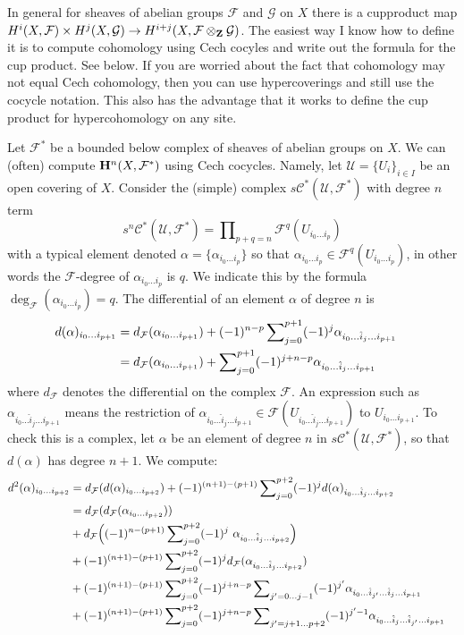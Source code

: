\noindent
In general for sheaves of abelian groups
${\mathcal F}$ and ${\mathcal G}$ on $X$ there is a cupproduct map
$H^i(X, {\mathcal F}) \times H^j(X, {\mathcal G}) \to
H^{i+j}(X, {\mathcal F}\otimes_{\bf Z} {\mathcal G})$. The easiest way
I know how to define it is to compute cohomology using Cech
cocyles and write out the formula for the cup product. See below.
If you are worried about the fact that cohomology may not
equal Cech cohomology, then you can use hypercoverings and still
use the cocycle notation. This also has the advantage that
it works to define the cup product for hypercohomology on any site.

\medskip\noindent
Let ${\mathcal F}^*$ be a bounded below complex of sheaves of abelian
groups on $X$. We can (often) compute ${\bf H}^n(X, {\mathcal F}^*)$
using Cech cocycles. Namely, let ${\mathcal U} = \{U_i\}_{i\in I}$
be an open covering of $X$. Consider the (simple) complex
$s{\mathcal C}^*({\mathcal U}, {\mathcal F}^*)$
with degree $n$ term
$$
s^n{\mathcal C}^*({\mathcal U}, {\mathcal F}^*) =
\prod\nolimits_{p+q=n} {\mathcal F}^q(U_{i_0\ldots i_p})
$$
with a typical element denoted $\alpha = \{\alpha_{i_0\ldots i_p}\}$
so that $\alpha_{i_0\ldots i_p} \in {\mathcal F}^{q}(U_{i_0\ldots i_p})$,
in other words the ${\mathcal F}$-degree of $\alpha_{i_0\ldots i_p}$ is $q$.
We indicate this by the formula $\deg_{\mathcal F}(\alpha_{i_0\ldots i_p})=q$.
The differential of an element $\alpha$ of degree $n$ is
\begin{align}
d(\alpha)_{i_0\ldots i_{p+1}}
& =
d_{{\mathcal F}}(\alpha_{i_0\ldots i_{p+1}})
+
(-1)^{n-p}
\sum\nolimits_{j=0}^{p+1}
(-1)^j
\alpha_{i_0\ldots \hat i_j \ldots i_{p+1}}\cr
& =
d_{{\mathcal F}}(\alpha_{i_0\ldots i_{p+1}})
+
\sum\nolimits_{j=0}^{p+1}
(-1)^{j+n-p}
\alpha_{i_0\ldots \hat i_j \ldots i_{p+1}}
\end{align}
where $d_{\mathcal F}$ denotes the differential on the complex ${\mathcal F}$.
An expression such as
$\alpha_{i_0\ldots\hat i_j\ldots i_{p+1}}$ means the restriction
of $\alpha_{i_0\ldots\hat i_j\ldots i_{p+1}} \in
{\mathcal F}(U_{i_0\ldots\hat i_j\ldots i_{p+1}})$ to 
$U_{i_0\ldots i_{p+1}}$.
To check this is a complex, let $\alpha$ be an element of
degree $n$ in $s{\mathcal C}^*({\mathcal U},{\mathcal F}^*)$, so that
$d(\alpha)$ has degree $n+1$. We compute:
\begin{align}
d^2(\alpha)_{i_0\ldots i_{p+2}} 
& =
d_{{\mathcal F}}(d(\alpha)_{i_0\ldots i_{p+2}})
+
(-1)^{(n+1)-(p+1)}
\sum\nolimits_{j=0}^{p+2}
(-1)^j
d(\alpha)_{i_0\ldots \hat i_j \ldots i_{p+2}}
\cr
& =
d_{\mathcal F}( d_{{\mathcal F}}(\alpha_{i_0\ldots i_{p+2}}) )
\cr
& +
d_{\mathcal F}\Big(
(-1)^{n-(p+1)}
\sum\nolimits_{j=0}^{p+2}
(-1)^j
\ \alpha_{i_0\ldots \hat i_j \ldots i_{p+2}}
\Big)
\cr
& +
(-1)^{(n+1)-(p+1)}
\sum\nolimits_{j=0}^{p+2}
(-1)^j
d_{{\mathcal F}}(\alpha_{i_0\ldots \hat i_j\ldots i_{p+2}})
\cr
& +
(-1)^{(n+1)-(p+1)}
\sum\nolimits_{j=0}^{p+2}
(-1)^{j+n-p}
\sum\nolimits_{j'=0\ldots j-1}
(-1)^{j'}
\alpha_{i_0\ldots \hat i_{j'}\ldots\hat i_{j} \ldots i_{p+1}}
\cr
& +
(-1)^{(n+1)-(p+1)}
\sum\nolimits_{j=0}^{p+2}
(-1)^{j+n-p}
\sum\nolimits_{j'=j+1\ldots p+2}
(-1)^{j'-1}
\alpha_{i_0\ldots \hat i_j\ldots\hat i_{j'} \ldots i_{p+1}}
\end{align}
